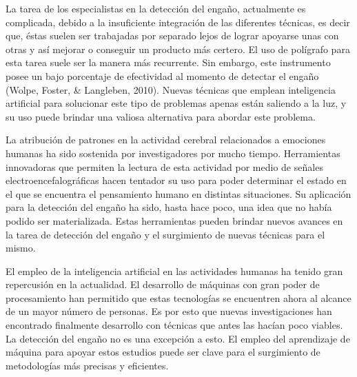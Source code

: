 La tarea de los especialistas en la detección del engaño, actualmente es complicada, debido a la insuficiente integración de las diferentes técnicas, es decir que, éstas suelen ser trabajadas por separado lejos de lograr apoyarse unas con otras y así mejorar o conseguir un producto más certero. El uso de polígrafo para esta tarea suele ser la manera más recurrente. Sin embargo, este instrumento posee un bajo porcentaje de efectividad al momento de detectar el engaño (Wolpe, Foster, \& Langleben, 2010). Nuevas técnicas que emplean inteligencia artificial para solucionar este tipo de problemas apenas están saliendo a la luz, y su uso puede brindar una valiosa alternativa para abordar este problema.

La atribución de patrones en la actividad cerebral relacionados a emociones humanas ha sido sostenida por investigadores por mucho tiempo. Herramientas innovadoras que permiten la lectura de esta actividad por medio de señales electroencefalográficas hacen tentador su uso para poder determinar el estado en el que se encuentra el pensamiento humano en distintas situaciones. Su aplicación para la detección del engaño ha sido, hasta hace poco, una idea que no había podido ser materializada. Estas herramientas pueden brindar nuevos avances en la tarea de detección del engaño y el surgimiento de nuevas técnicas para el mismo. 

El empleo de la inteligencia artificial en las actividades humanas ha tenido gran repercusión en la actualidad. El desarrollo de máquinas con gran poder de procesamiento han permitido que estas tecnologías se encuentren ahora al alcance de un mayor número de personas. Es por esto que nuevas investigaciones han encontrado finalmente desarrollo con técnicas que antes las hacían poco viables. La detección del engaño no es una excepción a esto. El empleo del aprendizaje de máquina para apoyar estos estudios puede ser clave para el surgimiento de metodologías más precisas y eficientes.  